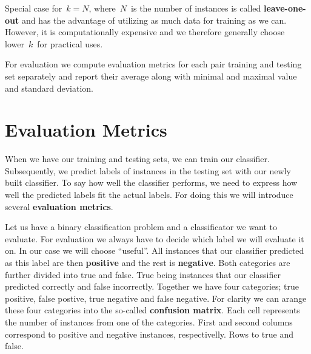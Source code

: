 Special case for~$k=N$,  where~$N$~is the number of instances is called {\bf leave-one-out} and has the advantage of 
utilizing as much data for training as we can.
However, it is computationally expensive and we therefore generally choose lower~$k$~for practical uses. 

For evaluation we compute evaluation metrics for each pair  training and testing set separately and report their average along with minimal and maximal value and standard deviation. 



\section{Evaluation Metrics}

When we have our training and testing sets, we can train our classifier.
Subsequently, we predict labels of instances in the testing set with our newly
built classifier.
To say how well the classifier performs, we need to express how well the predicted
labels fit the actual labels.
For doing this we will introduce several {\bf evaluation metrics}.

Let us have a binary classification problem and a classificator we want to evaluate.
For evaluation we always have to decide which label we will evaluate it on.
In our case we will choose ``useful''.
All instances that our classifier predicted as this label are then {\bf positive} and the rest is {\bf negative}.
Both categories are further divided into true and false.
True being instances that our classifier predicted correctly and false incorrectly.
Together we have four categories; \jh{:}
true positive, false postive, true negative and false negative.
For clarity we can arange these four categories into the so-called {\bf confusion matrix}.
Each cell represents the number of instances from one of the categories.
First and second columns correspond to positive and negative instances, respectivelly.
Rows to true and false.

